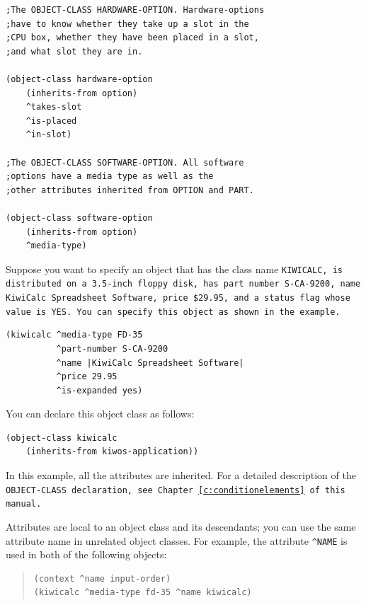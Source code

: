 \begin{exampl}
\begin{verbatim}
;The OBJECT-CLASS HARDWARE-OPTION. Hardware-options
;have to know whether they take up a slot in the
;CPU box, whether they have been placed in a slot,
;and what slot they are in.

(object-class hardware-option
    (inherits-from option)
    ^takes-slot
    ^is-placed
    ^in-slot)

;The OBJECT-CLASS SOFTWARE-OPTION. All software
;options have a media type as well as the
;other attributes inherited from OPTION and PART.

(object-class software-option
    (inherits-from option)
    ^media-type)
\end{verbatim}
\label{e:declattr}
\end{exampl}

Suppose you want to specify an object that has the class name
\tt{KIWICALC}, is distributed on a 3.5-inch floppy disk, has part
number S-CA-9200, name KiwiCalc Spreadsheet Software, price {\$}29.95,
and a status flag whose value is \tt{YES}. You can specify this object
as shown in the example.

\begin{exampl}
\label{e:specobj}
\begin{verbatim}
(kiwicalc ^media-type FD-35
          ^part-number S-CA-9200
          ^name |KiwiCalc Spreadsheet Software|
          ^price 29.95
          ^is-expanded yes)
\end{verbatim}
You can declare this object class as follows:
\begin{verbatim}
(object-class kiwicalc
    (inherits-from kiwos-application))
\end{verbatim}           
In this example, all the attributes are inherited. For a detailed
description of the \tt{OBJECT-CLASS} declaration, see
Chapter~\ref{c:conditionelements} of this manual.
\end{exampl}

Attributes are local to an object class and its descendants;
you can use the same attribute name in unrelated object
classes. For example, the attribute \verb|^NAME| is used in both of
the following objects:

\begin{quote}
\begin{verbatim}
(context ^name input-order)
(kiwicalc ^media-type fd-35 ^name kiwicalc)
\end{verbatim}
\end{quote}

